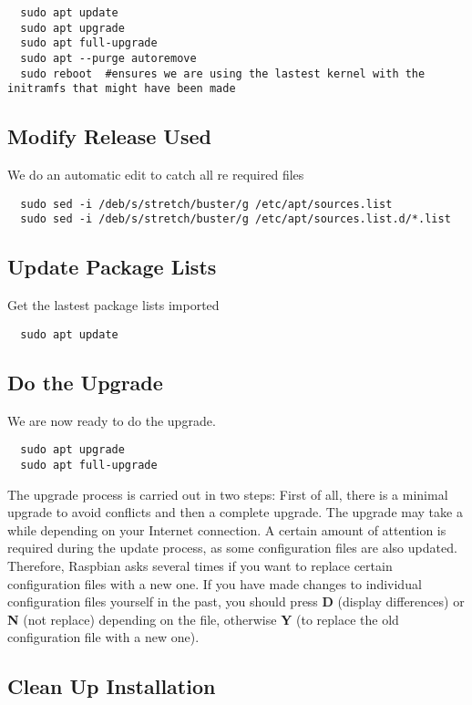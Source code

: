 \documentclass[Draft]{akc}
\begin{document}
\begin{lstlisting}
  sudo apt update
  sudo apt upgrade
  sudo apt full-upgrade
  sudo apt --purge autoremove
  sudo reboot  #ensures we are using the lastest kernel with the initramfs that might have been made
\end{lstlisting}
\subsection{Modify Release Used}
We do an automatic edit to catch all re required files
\begin{lstlisting}
  sudo sed -i /deb/s/stretch/buster/g /etc/apt/sources.list
  sudo sed -i /deb/s/stretch/buster/g /etc/apt/sources.list.d/*.list
\end{lstlisting}

\subsection{Update Package Lists}
Get the lastest package lists imported
\begin{lstlisting}
  sudo apt update
\end{lstlisting}

\subsection{Do the Upgrade}
We are now ready to do the upgrade.
\begin{lstlisting}
  sudo apt upgrade
  sudo apt full-upgrade
\end{lstlisting}

The upgrade process is carried out in two steps: First of all, there is a minimal upgrade to avoid
conflicts and then a complete upgrade. The upgrade may take a while depending on your Internet
connection. A certain amount of attention is required during the update process, as some
configuration files are also updated. Therefore, Raspbian asks several times if you want to replace
certain configuration files with a new one. If you have made changes to individual configuration
files yourself in the past, you should press \textbf{D} (display differences) or \textbf{N} (not replace) depending on
the file, otherwise \textbf{Y} (to replace the old configuration file with a new one).

\subsection{Clean Up Installation}
\end{document}
